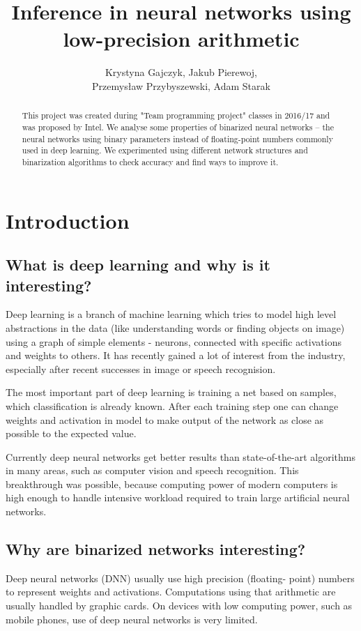 \documentclass[licencjacka]{pracamgr}
\title{Inference in neural networks using low-precision arithmetic}
\author{Krystyna Gajczyk, Jakub Pierewoj,\\ Przemysław Przybyszewski, Adam Starak}
\begin{document}
\maketitle
\begin{abstract}
This project was created during "Team programming project" classes in 2016/17 and was proposed by Intel. We analyse some properties of binarized neural networks -- the neural networks using binary parameters instead of floating-point numbers commonly used in deep learning. We experimented using different network structures and binarization algorithms to check accuracy and find ways to improve it.
\end{abstract}

\tableofcontents

\chapter{Introduction}
	
\section{What is deep learning and why is it interesting?}

Deep learning is a branch of machine learning which tries to model high level abstractions in the data (like understanding words or finding objects on image) using a graph of simple elements - neurons, connected with specific activations and weights to others. It has recently gained a lot of interest from the industry, especially after recent successes in image or speech recognision.

The most important part of deep learning is training a net based on samples, which classification is already known. After each training step one can change weights and activation in model to make output of the network as close as possible to the expected value.

Currently deep neural networks get better results than state-of-the-art algorithms in many areas, such as computer vision and speech recognition. This breakthrough was possible, because computing power of modern computers is high enough to handle intensive workload required to train large artificial neural networks.

\section{Why are binarized networks interesting?}
	Deep neural networks (DNN) usually use high precision (floating- point) numbers to represent
	weights and activations. Computations using that arithmetic are usually handled by
	graphic cards. On devices with low computing power, such as mobile phones, use of deep neural networks is very limited.
	
\end{document}
